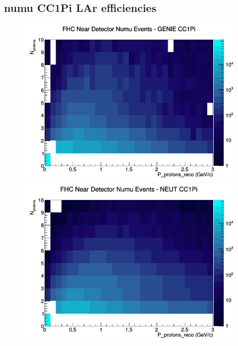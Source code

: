 \documentclass[12pt]{article}
\begin{document}
\subsection{numu CC1Pi LAr efficiencies}
\begin{figure}[h]
\includegraphics[width=\linewidth]{eff_N_P/LAr/protons/CC1Pi_FHC_ND_numu_N_P_GENIE.png}
\endminipage
{}
\includegraphics[width=\linewidth]{eff_N_P/LAr/protons/CC1Pi_FHC_ND_numu_N_P_NEUT.png}
\endminipage
{}

\end{figure}
\end{document}
